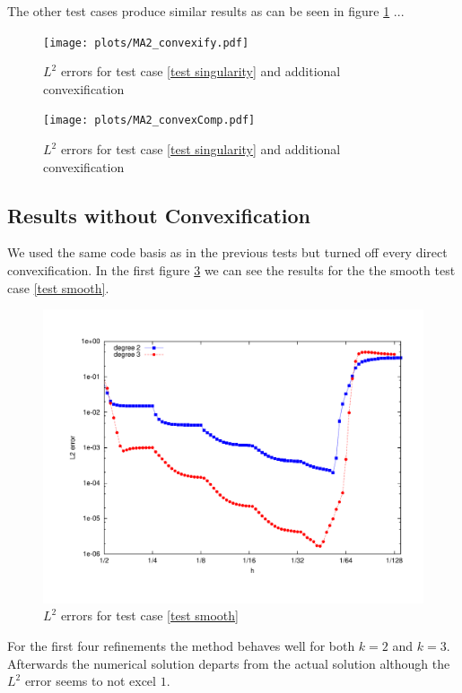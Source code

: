 The other test cases produce similar results as can be seen in figure \ref{fig: l2 errors test singularity ourMethodConvex} ... \todo{}

\begin{figure}[H]
\centering
	\texttt{[image: plots/MA2\_convexify.pdf]}
	\caption{$L^2$ errors for test case \ref{test singularity} and additional convexification}
	\label{fig: l2 errors test singularity ourMethodConvex}
\end{figure}
\begin{figure}[H]
\centering
	\texttt{[image: plots/MA2\_convexComp.pdf]}
	\caption{$L^2$ errors for test case \ref{test singularity} and additional convexification}
	\label{fig: Compare test singularity ourMethodConvex}
\end{figure}



\subsection{Results without Convexification}

We used the same code basis as in the previous tests but turned off every direct convexification.
In the first figure \ref{fig: l2 errors test smooth ourMethod} we can see the results for the the smooth test case \ref{test smooth}.
\begin{figure}[h!]
	\centering
	\includegraphics[scale =0.4]{plots/MA1.pdf}
	\caption{$L^2$ errors for test case \ref{test smooth}}
	\label{fig: l2 errors test smooth ourMethod}
\end{figure}
 For the first four refinements the method behaves well for both $k=2$ and $k=3$. Afterwards the numerical solution departs from the actual solution although the $L^2$ error seems to not excel $1$.
 

